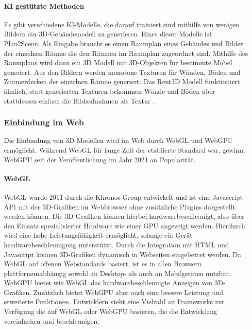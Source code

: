 \paragraph{KI gestützte Methoden}
Es gibt verschiedene KI-Modelle, die darauf trainiert sind mithilfe von wenigen Bildern ein 3D-Gebäudemodell zu generieren. Eines dieser Modelle ist Plan2Scene. Als Eingabe braucht es einen Raumplan eines Gebäudes und Bilder der einzelnen Räume die den Räumen im Raumplan zugeordnet sind. Mithilfe des Raumplans wird dann ein 3D Modell mit 3D-Objekten für bestimmte Möbel generiert. Aus den Bildern werden monotone Texturen für Wänden, Böden und Zimmerdecken der einzelnen Räume generiert.\cite[S.~10733]{Plan2Scene2021} Das Rent3D Modell funktioniert ähnlich, statt generierten Texturen bekommen Wände und Böden aber stattdessen einfach die Bildaufnahmen als Textur \cite[S.~3413]{Rent3D2015}.

\subsubsection{Einbindung im Web}
Die Einbindung von 3D-Modellen wird im Web durch \ac{WebGL} und WebGPU ermöglicht. Während \ac{WebGL} für lange Zeit der etablierte Standard war, gewinnt WebGPU seit der Veröffentlichung im Jahr 2021 an Popularität.

\paragraph{WebGL}
\ac{WebGL} wurde 2011 durch die Khronos Group entwickelt und ist eine Javascript-API mit der 3D-Grafiken im Webbrowser ohne zusätzliche Plugins dargestellt werden können. Die 3D-Grafiken können hierbei hardwarebeschleunigt, also über den Einsatz spezialisierter Hardware wie einer \ac{GPU} angezeigt werden. Hierdurch wird eine hohe Leistungsfähigkeit ermöglicht, solange ein Gerät hardwarebeschleunigung unterstützt. Durch die Integration mit HTML und Javascript können 3D-Grafiken dynamisch in Webseiten eingebettet werden. Da \ac{WebGL} auf offenen Webstandards basiert, ist es in allen Browsern plattformunabhängig sowohl an Desktop- als auch an Mobilgeräten nutzbar.\cite[S.~17-19]{Parisi2014} WebGPU bietet wie WebGL das hardwarebeschleunigte Anzeigen von 3D-Grafiken. Zusätzlich bietet WebGPU aber auch eine bessere Leistung und erweiterte Funktionen.\cite{WebGPU} Entwicklern steht eine Vielzahl an Frameworks zur Verfügung die auf \ac{WebGL} oder \ac{WebGPU} basieren, die die Entwicklung vereinfachen und beschleunigen.\cite{Seguin2024}

